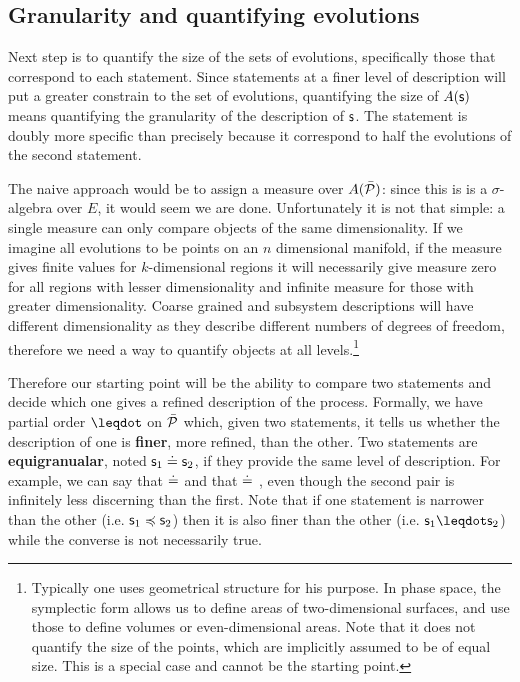 \documentclass[letterpaper]{article}
\begin{document}
\subsection{Granularity and quantifying evolutions}

Next step is to quantify the size of the sets of evolutions, specifically those that correspond to each statement. Since statements at a finer level of description will put a greater constrain to the set of evolutions, quantifying the size of $A(\stmt)$ means quantifying the granularity of the description of $\stmt$. The statement  is doubly more specific than  precisely because it correspond to half the evolutions of the second statement.

The naive approach would be to assign a measure over $A(\tdomain[P])$: since this is is a $\sigma$-algebra over $E$, it would seem we are done. Unfortunately it is not that simple: a single measure can only compare objects of the same dimensionality. If we imagine all evolutions to be points on an $n$ dimensional manifold, if the measure gives finite values for $k$-dimensional regions it will necessarily give measure zero for all regions with lesser dimensionality and infinite measure for those with greater dimensionality. Coarse grained and subsystem descriptions will have different dimensionality as they describe different numbers of degrees of freedom, therefore we need a way to quantify objects at all levels.\footnote{Typically one uses geometrical structure for his purpose. In phase space, the symplectic form allows us to define areas of two-dimensional surfaces, and use those to define volumes or even-dimensional areas. Note that it does not quantify the size of the points, which are implicitly assumed to be of equal size. This is a special case and cannot be the starting point.}

Therefore our starting point will be the ability to compare two statements and decide which one gives a refined description of the process. Formally, we have partial order $\finer$ on $\tdomain[P]$ which, given two statements, it tells us whether the description of one is \textbf{finer}, more refined, than the other. Two statements are \textbf{equigranualar}, noted $\stmt_1 \eqgran \stmt_2$, if they provide the same level of description. For example, we can say that  $\eqgran$  and that  $\eqgran$ , even though the second pair is infinitely less discerning than the first. Note that if one statement is narrower than the other (i.e. $\stmt_1 \narrower \stmt_2$) then it is also finer than the other (i.e. $\stmt_1 \finer \stmt_2$) while the converse is not necessarily true. 
\end{document}
